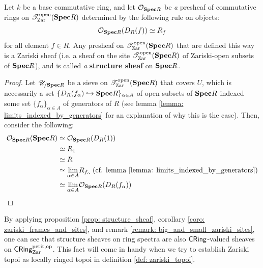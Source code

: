                 \begin{proposition} \label{prop: structure_sheaf} 
                    Let $k$ be a base commutative ring, and let $\mathcal{O}_{\mathbf{Spec} R}$ be \textit{a} presheaf of commutative rings on $\mathscr{T}^{\mathrm{open}}_{\mathrm{Zar}}(\mathbf{Spec} R)$ determined by the following rule on objects:
                        $$\mathcal{O}_{\mathbf{Spec} R}(D_R(f)) \simeq R_f$$
                    for all element $f \in R$. Any presheaf on $\mathscr{T}^{\mathrm{open}}_{\mathrm{Zar}}(\mathbf{Spec} R)$ that are defined this way is a Zariski sheaf (i.e. a sheaf on the site $\mathscr{T}^{\mathrm{open}}_{\mathrm{Zar}}(\mathbf{Spec} R)$ of Zariski-open subsets of $\mathbf{Spec} R$), and is called \textit{a} \textbf{structure sheaf} on $\mathbf{Spec} R$.
                \end{proposition}
                    \begin{proof}
                        Let $\mathscr{U}_{/\mathbf{Spec} R}$ be a sieve on $\mathscr{T}^{\mathrm{open}}_{\mathrm{Zar}}(\mathbf{Spec} R)$ that covers $U$, which is necessarily a set $\{D_R(f_{\alpha}) \hookrightarrow \mathbf{Spec} R\}_{\alpha \in A}$ of open subsets of $\mathbf{Spec} R$ indexed some set $\{f_{\alpha}\}_{\alpha \in A}$ of generators of $R$ (see lemma \ref{lemma: limits_indexed_by_generators} for an explanation of why this is the case). Then, consider the following:
                            $$
                                \begin{aligned}
                                    \mathcal{O}_{\mathbf{Spec} R}(\mathbf{Spec} R) & \simeq \mathcal{O}_{\mathbf{Spec} R}(D_R(1))
                                    \\
                                    & \simeq R_1
                                    \\
                                    & \simeq R
                                    \\
                                    & \simeq \underset{\alpha \in A}{\operatorname{lim}} R_{f_{\alpha}} \: \text{(cf. lemma \ref{lemma: limits_indexed_by_generators})}
                                    \\
                                    & \simeq \underset{\alpha \in A}{\operatorname{lim}} \mathcal{O}_{\mathbf{Spec} R}(D_R(f_{\alpha}))
                                \end{aligned}
                            $$
                    \end{proof}
                \begin{corollary}
                    By applying proposition \ref{prop: structure_sheaf}, corollary \ref{coro: zariski_frames_and_sites}, and remark \ref{remark: big_and_small_zariski_sites}, one can see that structure sheaves on ring spectra are also $\mathsf{CRing}$-valued sheaves on $\mathsf{CRing}^{\mathrm{petit}, \mathrm{op}}_{\mathrm{Zar}}$. This fact will come in handy when we try to establish Zariski topoi as locally ringed topoi in definition \ref{def: zariski_topoi}.
                \end{corollary}
